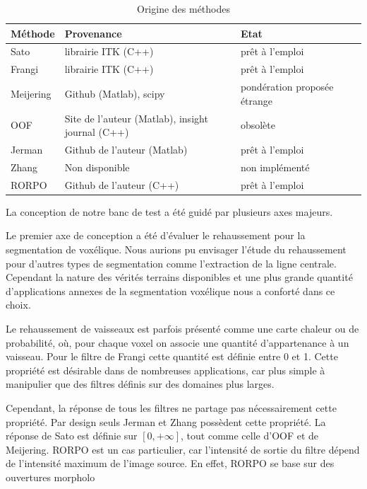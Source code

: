   \begin{table}
    \begin{center}
        \begin{tabular}{l|l|l|l}
            Méthode   &  Provenance                                     & Etat \\ \hline  \hline 
            Sato      & librairie ITK (C++)                             & prêt à l'emploi \\ \hline
            Frangi    & librairie ITK (C++)                             & prêt à l'emploi \\ \hline
            Meijering & Github (Matlab), scipy                          & pondération proposée étrange  \\ \hline
            OOF       & Site de l'auteur (Matlab), insight journal (C++)& obsolète \\ \hline
            Jerman    & Github de l'auteur (Matlab)                     & prêt à l'emploi \\ \hline
            Zhang     & Non disponible                                  & non implémenté \\ \hline
            RORPO     & Github de l'auteur (C++)                        & prêt à l'emploi  
        \end{tabular}
    \end{center}
    \caption{Origine des méthodes}
    \label{Tab:origins_vesselness}
  \end{table}

La conception de notre banc de test a été guidé par plusieurs axes majeurs.
  
Le premier axe de conception a été d'évaluer le rehaussement pour la segmentation de voxélique. Nous aurions pu envisager l'étude du rehaussement pour d'autres types de segmentation comme l'extraction de la ligne centrale. Cependant la nature des vérités terrains disponibles et une plus grande quantité d'applications annexes de la segmentation voxélique nous a conforté dans ce choix.

Le rehaussement de vaisseaux est parfois présenté comme une carte chaleur ou de probabilité, où, pour chaque voxel on associe une quantité d'appartenance à un vaisseau. Pour le filtre de Frangi cette quantité est définie entre 0 et 1. Cette propriété est désirable dans de nombreuses applications, car plus simple à manipulier que des filtres définis sur des domaines plus larges.

Cependant, la réponse de tous les filtres ne partage pas nécessairement cette propriété. Par design seuls Jerman et Zhang possèdent cette propriété. La réponse de Sato est définie sur $[0,+\infty]$, tout comme celle d'OOF et de Meijering. RORPO est un cas particulier, car l'intensité de sortie du filtre dépend de l'intensité maximum de l'image source. En effet, RORPO se base sur des ouvertures morpholo 

